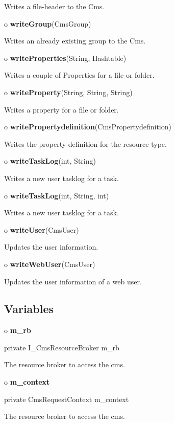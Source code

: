 \begin{description}
Writes a file-header to the Cms.  
\item o {\bf writeGroup}(CmsGroup)  

Writes an already existing group to the Cms.  
\item o {\bf writeProperties}(String, Hashtable)  

Writes a couple of Properties for a file or folder.  
\item o {\bf writeProperty}(String, String, String)  

Writes a property for a file or folder.  
\item o {\bf writePropertydefinition}(CmsPropertydefinition)  

Writes the property-definition for the resource type.  
\item o {\bf writeTaskLog}(int, String)  

Writes a new user tasklog for a task.  
\item o {\bf writeTaskLog}(int, String, int)  

Writes a new user tasklog for a task.  
\item o {\bf writeUser}(CmsUser)  

Updates the user information.  
\item o {\bf writeWebUser}(CmsUser)  

Updates the user information of a web user. 
\end{description}

\subsection*{  Variables }

o {\bf m\_rb} 

\begin{PRE}
 private I\_CmsResourceBroker m\_rb
\end{PRE}

\begin{description}
\htmlDD The resource broker to access the cms.

\end{description}

o {\bf m\_context} 

\begin{PRE}
 private CmsRequestContext m\_context
\end{PRE}

\begin{description}
\htmlDD The resource broker to access the cms.

\end{description}

